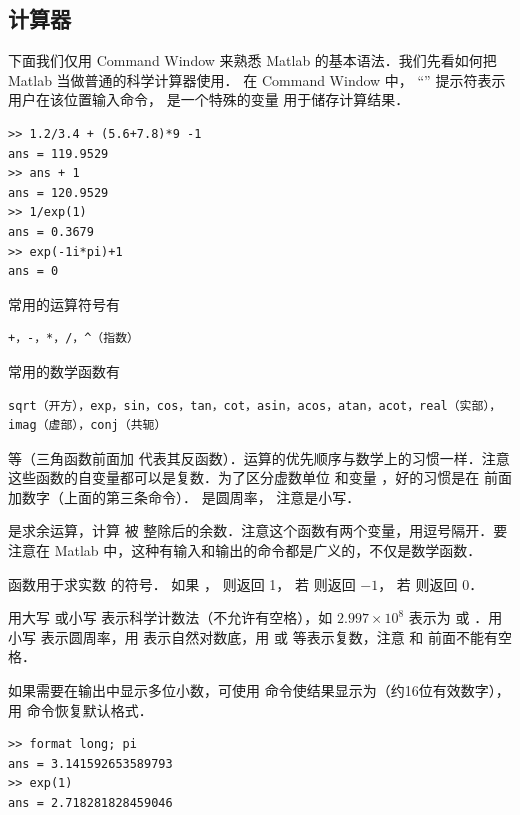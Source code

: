 \subsection{计算器}
下面我们仅用 Command Window 来熟悉 Matlab 的基本语法．我们先看如何把 Matlab 当做普通的科学计算器使用． 在 Command Window 中， “\x{>>}” 提示符表示用户在该位置输入命令，  是一个特殊的变量 用于储存计算结果．
\begin{lstlisting}[language=MatlabCom]
>> 1.2/3.4 + (5.6+7.8)*9 -1
ans = 119.9529
>> ans + 1
ans = 120.9529
>> 1/exp(1)
ans = 0.3679
>> exp(-1i*pi)+1
ans = 0
\end{lstlisting}
常用的运算符号有
\begin{lstlisting}[language=MatlabCom]
+，-，*，/，^（指数）
\end{lstlisting}
常用的数学函数有
\begin{lstlisting}[language=MatlabCom]
sqrt（开方），exp，sin，cos，tan，cot，asin，acos，atan，acot，real（实部），imag（虚部），conj（共轭）
\end{lstlisting}
等（三角函数前面加  代表其反函数）．运算的优先顺序与数学上的习惯一样．注意这些函数的自变量都可以是复数．为了区分虚数单位  和变量 ，好的习惯是在  前面加数字（上面的第三条命令）．  是圆周率， 注意是小写．

 是求余运算，计算  被  整除后的余数．注意这个函数有两个变量，用逗号隔开．要注意在 Matlab 中，这种有输入和输出的命令都是广义的，不仅是数学函数．

 函数用于求实数  的符号． 如果 ， 则返回 1， 若  则返回 $-1$， 若  则返回 0．

用大写  或小写  表示科学计数法（不允许有空格），如 $2.997\times 10^8$ 表示为  或 ．用小写  表示圆周率，用  表示自然对数底，用  或  等表示复数，注意  和  前面不能有空格．

如果需要在输出中显示多位小数，可使用  命令使结果显示为（约16位有效数字），用  命令恢复默认格式．
\begin{lstlisting}[language=MatlabCom]
>> format long; pi
ans = 3.141592653589793
>> exp(1)
ans = 2.718281828459046
\end{lstlisting}
